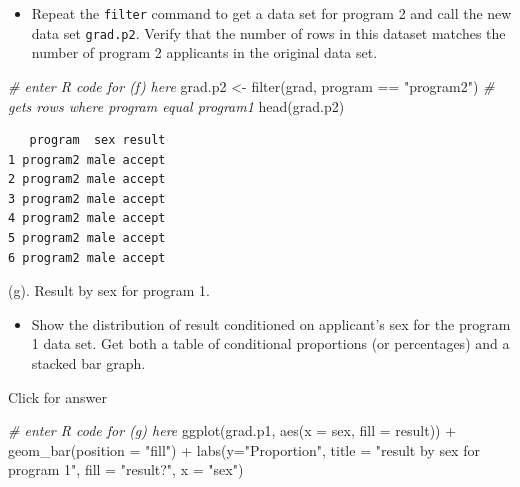 \documentclass[
]{book}
\newenvironment{Shaded}{\begin{snugshade}}{\end{snugshade}}
\newcommand{\AttributeTok}[1]{\textcolor[rgb]{0.77,0.63,0.00}{#1}}
\newcommand{\CommentTok}[1]{\textcolor[rgb]{0.56,0.35,0.01}{\textit{#1}}}
\newcommand{\FunctionTok}[1]{\textcolor[rgb]{0.00,0.00,0.00}{#1}}
\newcommand{\NormalTok}[1]{#1}
\newcommand{\OtherTok}[1]{\textcolor[rgb]{0.56,0.35,0.01}{#1}}
\newcommand{\SpecialCharTok}[1]{\textcolor[rgb]{0.00,0.00,0.00}{#1}}
\newcommand{\StringTok}[1]{\textcolor[rgb]{0.31,0.60,0.02}{#1}}
\providecommand{\tightlist}{%
  \setlength{\itemsep}{0pt}\setlength{\parskip}{0pt}}
\begin{document}
\begin{itemize}
\tightlist
\item
  Repeat the \texttt{filter} command to get a data set for program 2 and call the new data set \texttt{grad.p2}. Verify that the number of rows in this dataset matches the number of program 2 applicants in the original data set.
\end{itemize}

\begin{Shaded}
\begin{Highlighting}[]
\CommentTok{\# enter R code for (f) here}
\NormalTok{grad.p2 }\OtherTok{\textless{}{-}} \FunctionTok{filter}\NormalTok{(grad, program }\SpecialCharTok{==} \StringTok{"program2"}\NormalTok{) }\CommentTok{\# gets rows where program equal program1}
\FunctionTok{head}\NormalTok{(grad.p2)}
\end{Highlighting}
\end{Shaded}

\begin{verbatim}
   program  sex result
1 program2 male accept
2 program2 male accept
3 program2 male accept
4 program2 male accept
5 program2 male accept
6 program2 male accept
\end{verbatim}

(g). Result by sex for program 1.

\begin{itemize}
\tightlist
\item
  Show the distribution of result conditioned on applicant's sex for the program 1 data set. Get both a table of conditional proportions (or percentages) and a stacked bar graph.
\end{itemize}

Click for answer

\begin{Shaded}
\begin{Highlighting}[]
\CommentTok{\# enter R code for (g) here}
\FunctionTok{ggplot}\NormalTok{(grad.p1, }\FunctionTok{aes}\NormalTok{(}\AttributeTok{x =}\NormalTok{ sex, }\AttributeTok{fill =}\NormalTok{ result)) }\SpecialCharTok{+}
 \FunctionTok{geom\_bar}\NormalTok{(}\AttributeTok{position =} \StringTok{"fill"}\NormalTok{) }\SpecialCharTok{+}
 \FunctionTok{labs}\NormalTok{(}\AttributeTok{y=}\StringTok{"Proportion"}\NormalTok{, }\AttributeTok{title =} \StringTok{"result by sex for program 1"}\NormalTok{,}
 \AttributeTok{fill =} \StringTok{"result?"}\NormalTok{, }\AttributeTok{x =} \StringTok{"sex"}\NormalTok{)}
\end{Highlighting}
\end{Shaded}
\end{document}
